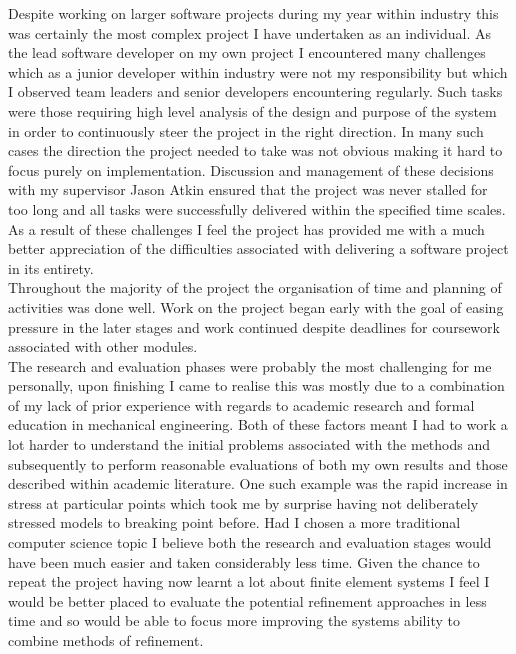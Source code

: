 \noindent
Despite working on larger software projects during my year within industry this was certainly the most complex project I have undertaken as an individual. As the lead software developer on my own project I encountered many challenges which as a junior developer within industry were not my responsibility but which I observed team leaders and senior developers encountering regularly. Such tasks were those requiring high level analysis of the design and purpose of the system in order to continuously steer the project in the right direction. In  many such cases the direction the project needed to take was not obvious making it hard to focus purely on implementation. Discussion and management of these decisions with my supervisor Jason Atkin ensured that the project was never stalled for too long and all tasks were successfully delivered within the specified time scales. As a result of these challenges I feel the project has provided me with a much better appreciation of the difficulties associated with delivering a software project in its entirety. \\ 

\noindent
Throughout the majority of the project the organisation of time and planning of activities was done well. Work on the project began early with the goal of easing pressure in the later stages and work continued despite deadlines for coursework associated with other modules. \\

\noindent
The research and evaluation phases were probably the most challenging for me personally, upon finishing I came to realise this was mostly due to a combination of my lack of prior experience with regards to academic research and formal education in mechanical engineering. Both of these factors meant I had to work a lot harder to understand the initial problems associated with the methods and subsequently to perform reasonable evaluations of both my own results and those described within academic literature. One such example was the rapid increase in stress at particular points which took me by surprise having not deliberately stressed models to breaking point before. Had I chosen a more traditional computer science topic I believe both the research and evaluation stages would have been much easier and taken considerably less time. Given the chance to repeat the project having now learnt a lot about finite element systems I feel I would be better placed to evaluate the potential refinement approaches in less time and so would be able to focus more improving the systems  ability to combine methods of refinement. \\ 

